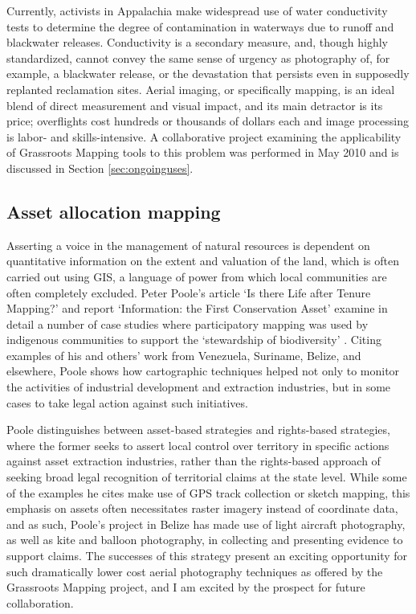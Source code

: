 \documentclass[11pt,oneside,notitlepage]{report}
\begin{document}
Currently, activists in Appalachia make widespread use of water conductivity tests to determine the degree of contamination in waterways due to runoff and blackwater releases. Conductivity is a secondary measure, and, though highly standardized, cannot convey the same sense of urgency as photography of, for example, a blackwater release, or the devastation that persists even in supposedly replanted reclamation sites. Aerial imaging, or specifically mapping, is an ideal blend of direct measurement and visual impact, and its main detractor is its price; overflights cost hundreds or thousands of dollars each and image processing is labor- and skills-intensive. A collaborative project examining the applicability of Grassroots Mapping tools to this problem was performed in May 2010 and is discussed in Section \ref{sec:ongoinguses}.

\subsection{Asset allocation mapping}

Asserting a voice in the management of natural resources is dependent on quantitative information on the extent and valuation of the land, which is often carried out using GIS, a language of power from which local communities are often completely excluded. Peter Poole's article `Is there Life after Tenure Mapping?' and report `Information: the First Conservation Asset' examine in detail a number of case studies where participatory mapping was used by indigenous communities to support the `stewardship of biodiversity' \cite{poole2007belize}. Citing examples of his and others' work from Venezuela, Suriname, Belize, and elsewhere, Poole shows how cartographic techniques helped not only to monitor the activities of industrial development and extraction industries, but in some cases to take legal action against such initiatives.  

Poole distinguishes between asset-based strategies and rights-based strategies, where the former seeks to assert local control over territory in specific actions against asset extraction industries, rather than the rights-based approach of seeking broad legal recognition of territorial claims at the state level. \cite{poole2006there} While some of the examples he cites make use of GPS track collection or sketch mapping, this emphasis on assets often necessitates raster imagery instead of coordinate data, and as such, Poole's project in Belize has made use of light aircraft photography, as well as kite and balloon photography, in collecting and presenting evidence to support claims. \cite{poole2007belize} The successes of this strategy present an exciting opportunity for such dramatically lower cost aerial photography techniques as offered by the Grassroots Mapping project, and I am excited by the prospect for future collaboration.
\end{document}
